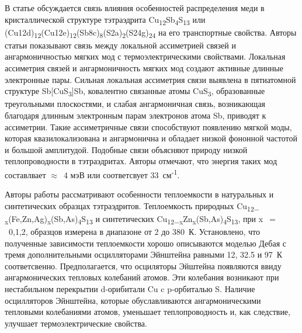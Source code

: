 В статье \cite{Lai_2015} обсуждается связь влияния особенностей распределения меди в кристаллической структуре тэтраэдрита Cu\textsubscript{12}Sb\textsubscript{4}S\textsubscript{13} или (Cu12d)\textsubscript{12}(Cu12e)\textsubscript{12}(Sb8c)\textsubscript{8}(S2a)\textsubscript{2}(S24g)\textsubscript{24} на его транспортные свойства. Авторы статьи показывают связь между локальной ассиметрией связей и ангармоничностью мягких мод с термоэлектрическими свойствами.  Локальная ассиметрия связей и ангармоничность мягких мод создают активные длинные электронные пары. Сильная локальная ассиметрия связи выявлена в пятиатомной структуре Sb[CuS\textsubscript{3}]Sb, ковалентно связанные атомы CuS\textsubscript{3}, образованные треугольными плоскостями, и слабая ангармоничная связь, возникающая благодаря длинным электронным парам электронов атома Sb, приводят к ассиметрии. Такие ассиметричные связи способствуют появлению мягкой моды, которая квазилокализована и ангармонична и обладает низкой фононной частотой и большой амплитудой. Подобные связи объясняют природу низкой теплопроводности в тэтраэдритах. Авторы отмечают, что энергия таких мод составлвает $\approx$~4 мэВ или соответсвует 33~см\textsuperscript{-1}.

Авторы работы \cite{Lara-Curzio2014} рассматривают особенности теплоемкости в натуральных и синтетических образцах тэтраэдритов. Теплоемкость природных  Cu\textsubscript{12$-$x}(Fe,Zn,Ag)\textsubscript{x}(Sb,As)\textsubscript{4}S\textsubscript{13} и синтетических Cu\textsubscript{12$-$x}Zn\textsubscript{x}(Sb,As)\textsubscript{4}S\textsubscript{13}, при x~$=$~0,1,2, образцов измерена в диапазоне от 2 до 380~К. Установлено, что полученные зависимости теплоемкости хорошо описываются моделью Дебая с тремя дополнительными осцилляторами Эйнштейна равными 12, 32.5 и 97~К соответсвенно. Предполагается, что осциляторы Эйштейна появляются ввиду ангармонических тепловых колебаний атомов. Эти колебания возникают при нестабильном перекрытии d-орибитали Cu c p-орбиталью S.
Наличие осцилляторов Эйнштейна, которые обуславливаются ангармоническими тепловыми колебаниями атомов, уменьшает теплопроводность и, как следствие, улучшает термоэлектрические свойства.

